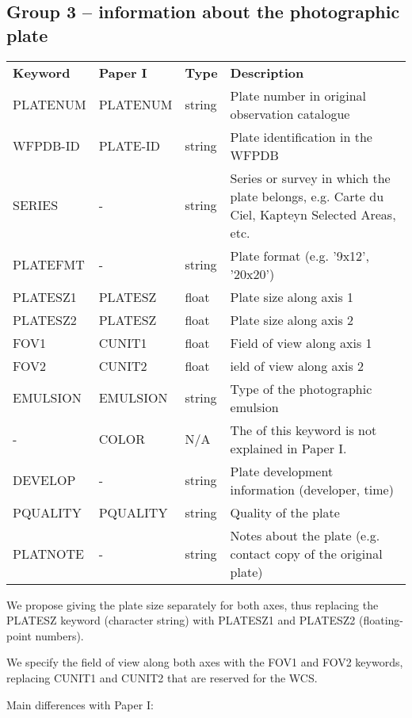 \documentclass[11pt]{ivoa}
\begin{document}
\subsection{Group 3 – information about the photographic plate}

\begin{inlinetable}
\footnotesize
\begin{tabular}{lllp{}}
\sptablerule
\textbf{Keyword}&\textbf{Paper I}&\textbf{Type}&\textbf{Description}\\
\sptablerule
PLATENUM &PLATENUM &string &Plate number in original observation
catalogue\\
WFPDB-ID &PLATE-ID &string &Plate identification in the WFPDB\\
SERIES   &  -      &string &Series or survey in which the plate belongs,
e.g. Carte du Ciel, Kapteyn Selected Areas, etc.\\
PLATEFMT &-        &string &Plate format (e.g. '9x12', '20x20')\\
PLATESZ1 &PLATESZ  &float  &Plate size along axis 1\\
PLATESZ2 &PLATESZ  &float  &Plate size along axis 2\\
FOV1     &CUNIT1   &float  &Field of view along axis 1\\
FOV2     &CUNIT2   &float  &ield of view along axis 2\\
EMULSION &EMULSION &string &Type of the photographic emulsion\\
-        &COLOR    &N/A    &The of this keyword is not explained in Paper
         I.\\
DEVELOP  &-        &string &Plate development information (developer,
time)\\
PQUALITY &PQUALITY &string &Quality of the plate\\
PLATNOTE &-        &string &Notes about the plate (e.g. contact copy of
the original plate)\\
\end{tabular}
\end{inlinetable}

We propose giving the plate size separately for both axes, thus replacing the PLATESZ keyword (character string) with PLATESZ1 and PLATESZ2 (floating-point numbers).

We specify the field of view along both axes with the FOV1 and FOV2 keywords, replacing CUNIT1 and CUNIT2 that are reserved for the WCS.

Main differences with Paper I:
\end{document}
